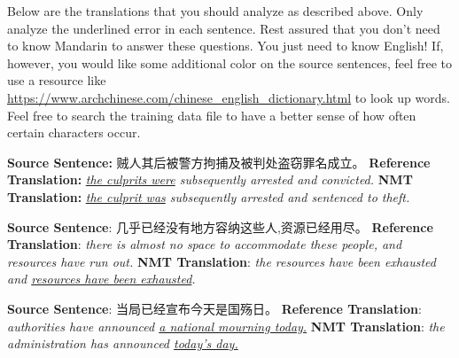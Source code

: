 \begin{parts}
    Below are the translations that you should analyze as described above. Only analyze the underlined error in each sentence. Rest assured that you don't need to know Mandarin to answer these questions. You just need to know English! If, however, you would like some additional color on the source sentences, feel free to use a resource like \url{https://www.archchinese.com/chinese_english_dictionary.html} to look up words. Feel free to search the training data file to have a better sense of how often certain characters occur.

    \begin{subparts}
        \subpart[2]
        \textbf{Source Sentence:} 贼人其后被警方拘捕及被判处盗窃罪名成立。 \newline
        \textbf{Reference Translation:} \textit{\underline{the culprits were} subsequently arrested and convicted.}\newline
        \textbf{NMT Translation:} \textit{\underline{the culprit was} subsequently arrested and sentenced to theft.}
        


        \subpart[2]
        \textbf{Source Sentence}: 几乎已经没有地方容纳这些人,资源已经用尽。\newline
        \textbf{Reference Translation}: \textit{there is almost no space to accommodate these people, and resources have run out.   }\newline
        \textbf{NMT Translation}: \textit{the resources have been exhausted and \underline{resources have been exhausted}.}
        

        \subpart[2]
        \textbf{Source Sentence}: 当局已经宣布今天是国殇日。 \newline
        \textbf{Reference Translation}: \textit{authorities have announced \underline{a national mourning today.}}\newline
        \textbf{NMT Translation}: \textit{the administration has announced \underline{today's day.}}
        

\end{subparts}
\end{parts}
